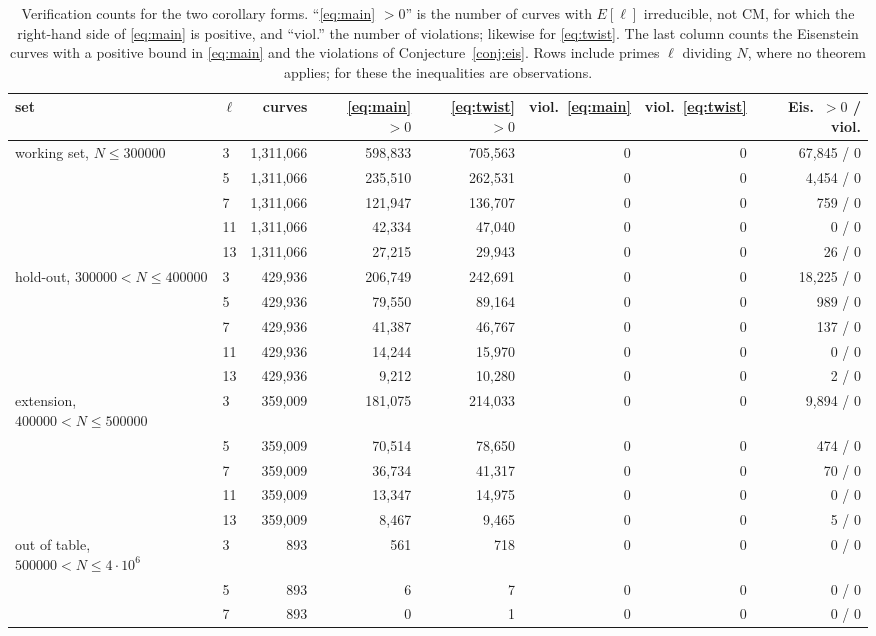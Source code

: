 \documentclass[11pt]{amsart}
\theoremstyle{definition}
\begin{document}
\begin{table}[ht]
\centering\footnotesize
{\footnotesize
\begin{tabular}{llrrrrrr}
\hline
set & $\ell$ & curves & \eqref{eq:main} $>0$ & \eqref{eq:twist} $>0$ & viol.\ \eqref{eq:main} & viol.\ \eqref{eq:twist} & Eis.\ $>0$ / viol. \\
\hline
working set, $N \le 300000$ & 3 & 1,311,066 & 598,833 & 705,563 & 0 & 0 & 67,845 / 0 \\
 & 5 & 1,311,066 & 235,510 & 262,531 & 0 & 0 & 4,454 / 0 \\
 & 7 & 1,311,066 & 121,947 & 136,707 & 0 & 0 & 759 / 0 \\
 & 11 & 1,311,066 & 42,334 & 47,040 & 0 & 0 & 0 / 0 \\
 & 13 & 1,311,066 & 27,215 & 29,943 & 0 & 0 & 26 / 0 \\
\hline
hold-out, $300000 < N \le 400000$ & 3 & 429,936 & 206,749 & 242,691 & 0 & 0 & 18,225 / 0 \\
 & 5 & 429,936 & 79,550 & 89,164 & 0 & 0 & 989 / 0 \\
 & 7 & 429,936 & 41,387 & 46,767 & 0 & 0 & 137 / 0 \\
 & 11 & 429,936 & 14,244 & 15,970 & 0 & 0 & 0 / 0 \\
 & 13 & 429,936 & 9,212 & 10,280 & 0 & 0 & 2 / 0 \\
\hline
extension, $400000 < N \le 500000$ & 3 & 359,009 & 181,075 & 214,033 & 0 & 0 & 9,894 / 0 \\
 & 5 & 359,009 & 70,514 & 78,650 & 0 & 0 & 474 / 0 \\
 & 7 & 359,009 & 36,734 & 41,317 & 0 & 0 & 70 / 0 \\
 & 11 & 359,009 & 13,347 & 14,975 & 0 & 0 & 0 / 0 \\
 & 13 & 359,009 & 8,467 & 9,465 & 0 & 0 & 5 / 0 \\
\hline
out of table, $500000 < N \le 4\cdot 10^6$ & 3 & 893 & 561 & 718 & 0 & 0 & 0 / 0 \\
 & 5 & 893 & 6 & 7 & 0 & 0 & 0 / 0 \\
 & 7 & 893 & 0 & 1 & 0 & 0 & 0 / 0 \\
\hline
\end{tabular}
}
\caption{Verification counts for the two corollary forms. ``\eqref{eq:main} $>0$'' is the number of curves with $E[\ell]$ irreducible, not CM, for which the right-hand side of \eqref{eq:main} is positive, and ``viol.'' the number of violations; likewise for \eqref{eq:twist}. The last column counts the Eisenstein curves with a positive bound in \eqref{eq:main} and the violations of Conjecture~\ref{conj:eis}. Rows include primes $\ell$ dividing $N$, where no theorem applies; for these the inequalities are observations.}\label{tab:counts}
\end{table}
\end{document}

